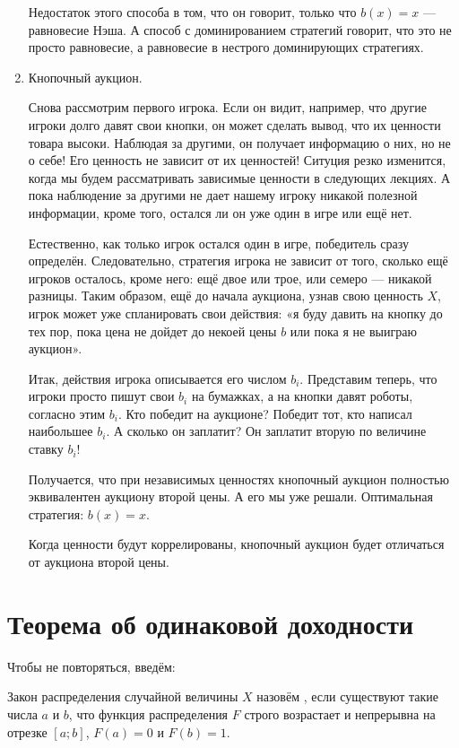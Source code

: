\begin{enumerate}
\begin{myex}
Недостаток этого способа в том, что он говорит, только что $ b(x)=x $ — равновесие Нэша. А способ с доминированием стратегий говорит, что это не просто равновесие, а равновесие в нестрого доминирующих стратегиях.
\end{myex}

\item Кнопочный аукцион.

Снова рассмотрим первого игрока. Если он видит, например, что другие игроки долго давят свои кнопки, он может сделать вывод, что их ценности товара высоки. Наблюдая за другими, он получает информацию о них, но не о себе! Его ценность не зависит от их ценностей! Ситуция резко изменится, когда мы будем рассматривать зависимые ценности в следующих лекциях. А пока наблюдение за другими не дает нашему игроку никакой полезной информации, кроме того, остался ли он уже один в игре или ещё нет.

Естественно, как только игрок остался один в игре, победитель сразу определён. Следовательно, стратегия игрока не зависит от того, сколько ещё игроков осталось, кроме него: ещё двое или трое, или семеро — никакой разницы. Таким образом, ещё до начала аукциона, узнав свою ценность $ X $, игрок может уже спланировать свои действия: «я буду давить на кнопку до тех пор, пока цена не дойдет до некоей цены $ b $ или пока я не выиграю аукцион».

Итак, действия игрока описывается его числом $ b_{i} $. Представим теперь, что игроки просто пишут свои $ b_{i} $ на бумажках, а на кнопки давят роботы, согласно этим $ b_{i} $. Кто победит на аукционе? Победит тот, кто написал наибольшее $ b_{i} $. А сколько он заплатит? Он заплатит вторую по величине ставку $ b_{i} $!

Получается, что при независимых ценностях кнопочный аукцион полностью эквивалентен аукциону второй цены. А его мы уже решали. Оптимальная стратегия: $ b(x)=x $.

Когда ценности будут коррелированы, кнопочный аукцион будет отличаться от аукциона второй цены.

\end{enumerate}


\section{Теорема об одинаковой доходности}

Чтобы не повторяться, введём:

\begin{mydef}
Закон распределения случайной величины $ X $ назовём , если существуют такие числа $a$ и $b$, что функция распределения $ F $ строго возрастает и непрерывна на отрезке $ [a;b] $, $ F(a)=0 $ и $ F(b)=1 $.
\end{mydef}


